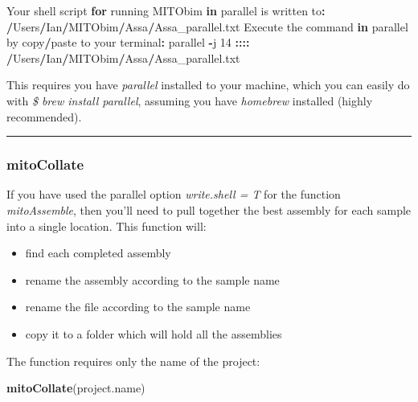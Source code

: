 \documentclass[
]{article}
\newenvironment{Shaded}{\begin{snugshade}}{\end{snugshade}}
\newcommand{\ControlFlowTok}[1]{\textcolor[rgb]{0.13,0.29,0.53}{\textbf{#1}}}
\newcommand{\DecValTok}[1]{\textcolor[rgb]{0.00,0.00,0.81}{#1}}
\newcommand{\ErrorTok}[1]{\textcolor[rgb]{0.64,0.00,0.00}{\textbf{#1}}}
\newcommand{\KeywordTok}[1]{\textcolor[rgb]{0.13,0.29,0.53}{\textbf{#1}}}
\newcommand{\NormalTok}[1]{#1}
\newcommand{\OperatorTok}[1]{\textcolor[rgb]{0.81,0.36,0.00}{\textbf{#1}}}
\newcommand{\StringTok}[1]{\textcolor[rgb]{0.31,0.60,0.02}{#1}}
\providecommand{\tightlist}{%
  \setlength{\itemsep}{0pt}\setlength{\parskip}{0pt}}
\begin{document}
\begin{Shaded}
\begin{Highlighting}[]
\NormalTok{Your shell script }\ControlFlowTok{for}\NormalTok{ running MITObim }\ControlFlowTok{in}\NormalTok{ parallel is written to}\OperatorTok{:}
\ErrorTok{/}\NormalTok{Users}\OperatorTok{/}\NormalTok{Ian}\OperatorTok{/}\NormalTok{MITObim}\OperatorTok{/}\NormalTok{Assa}\OperatorTok{/}\NormalTok{Assa\_parallel.txt}
\NormalTok{Execute the command }\ControlFlowTok{in}\NormalTok{ parallel by copy}\OperatorTok{/}\NormalTok{paste to your terminal}\OperatorTok{:}
\NormalTok{parallel }\OperatorTok{{-}}\NormalTok{j }\DecValTok{14} \OperatorTok{:::}\ErrorTok{:}\StringTok{ }\ErrorTok{/}\NormalTok{Users}\OperatorTok{/}\NormalTok{Ian}\OperatorTok{/}\NormalTok{MITObim}\OperatorTok{/}\NormalTok{Assa}\OperatorTok{/}\NormalTok{Assa\_parallel.txt}
\end{Highlighting}
\end{Shaded}

This requires you have \emph{parallel} installed to your machine, which
you can easily do with \emph{\$ brew install parallel}, assuming you
have \emph{homebrew} installed (highly recommended).

\begin{center}\rule{0.5\linewidth}{0.5pt}\end{center}

\hypertarget{mitocollate}{%
\subsubsection{mitoCollate}\label{mitocollate}}

If you have used the parallel option \emph{write.shell = T} for the
function \emph{mitoAssemble}, then you'll need to pull together the best
assembly for each sample into a single location. This function will:

\begin{itemize}
\tightlist
\item
  find each completed assembly
\item
  rename the assembly according to the sample name
\item
  rename the file according to the sample name
\item
  copy it to a folder which will hold all the assemblies
\end{itemize}

The function requires only the name of the project:

\begin{Shaded}
\begin{Highlighting}[]
\KeywordTok{mitoCollate}\NormalTok{(project.name)}
\end{Highlighting}
\end{Shaded}
\end{document}
